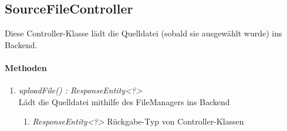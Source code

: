 \subsection*{SourceFileController}\label{srcCon}
Diese Controller-Klasse lädt die Quelldatei (sobald sie ausgewählt wurde) ins Backend.

\paragraph{Methoden}

\begin{enumerate}[+]
	\item \textit{ uploadFile() : ResponseEntity<?>}\\
	 Lädt die Quelldatei mithilfe des FileManagers ins Backend
	
	\begin{enumerate}[$\circ$]
		\item \textit{ResponseEntity<?>} Rückgabe-Typ von Controller-Klassen
	\end{enumerate}

\end{enumerate}
